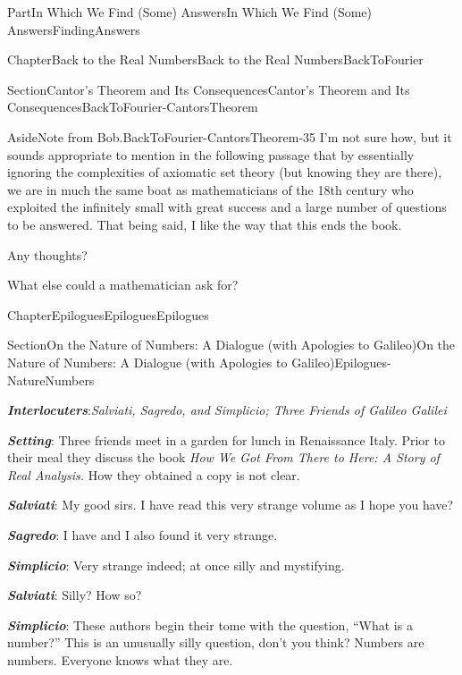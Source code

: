 \documentclass[oneside,10pt,]{book}
\newcommand{\alert}[1]{\textbf{\textit{#1}}}
\numberwithin{equation}{part}
\begin{document}
\begin{partptx}{Part}{In Which We Find (Some) Answers}{}{In Which We Find (Some) Answers}{}{}{FindingAnswers}
\begin{chapterptx}{Chapter}{Back to the Real Numbers}{}{Back to the Real Numbers}{}{}{BackToFourier}
\begin{sectionptx}{Section}{Cantor's Theorem and Its Consequences}{}{Cantor's Theorem and Its Consequences}{}{}{BackToFourier-CantorsTheorem}
\begin{aside}{Aside}{Note from Bob.}{BackToFourier-CantorsTheorem-35}%
I'm not sure how, but it sounds appropriate to mention in the following passage that by essentially ignoring the complexities of axiomatic set theory (but knowing they are there), we are in much the same boat as mathematicians of the 18th century who exploited the infinitely small with great success and a large number of questions to be answered.  That being said, I like the way that this ends the book.%
\par
Any thoughts?%
\end{aside}
What else could a mathematician ask for?%
\end{sectionptx}
\end{chapterptx}
%
%
\typeout{************************************************}
\typeout{************************************************}
%
\begin{chapterptx}{Chapter}{Epilogues}{}{Epilogues}{}{}{Epilogues}
\renewcommand*{\chaptername}{Chapter}
%
%
\typeout{************************************************}
\typeout{************************************************}
%
\begin{sectionptx}{Section}{On the Nature of Numbers: A Dialogue (with Apologies to Galileo)}{}{On the Nature of Numbers: A Dialogue (with Apologies to Galileo)}{}{}{Epilogues-NatureNumbers}
\begin{introduction}{}%
\alert{Interlocuters}:\emph{Salviati, Sagredo, and Simplicio; Three Friends of Galileo Galilei}%
\par
\alert{Setting}: Three friends meet in a garden for lunch in Renaissance Italy.  Prior to their meal they discuss the book \emph{How We Got From There to Here: A Story of Real Analysis.} How they obtained a copy is not clear.%
\par
\alert{Salviati}: My good sirs. I have read this very strange volume as I hope you have?%
\par
\alert{Sagredo}: I have and I also found it very strange.%
\par
\alert{Simplicio}: Very strange indeed; at once silly and mystifying.%
\par
\alert{Salviati}: Silly? How so?%
\par
\alert{Simplicio}: These authors begin their tome with the question, ``What is a number?'' This is an unusually silly question, don't you think? Numbers are numbers. Everyone knows what they are.%

\end{introduction}
\end{sectionptx}
\end{chapterptx}
\end{partptx}
\end{document}
